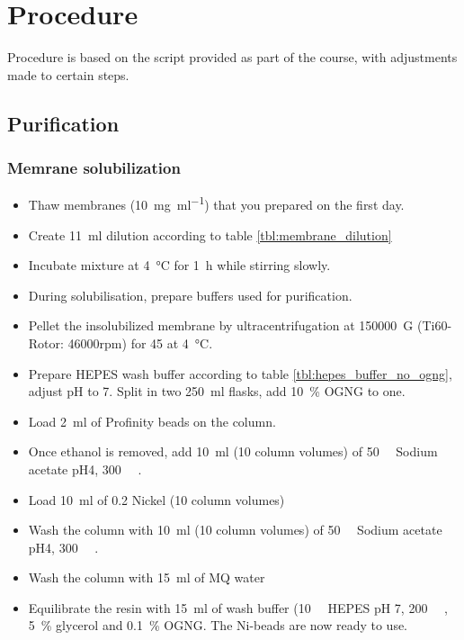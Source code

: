 \chapter{Procedure}

Procedure is based on the script provided as part of the course, with
adjustments made to certain steps.\cite{skript_ballmoos}

\section{Purification}

\subsection{Memrane solubilization}

\begin{itemize}
	\item Thaw membranes (\SI{10}{\mg\per\ml}) that you prepared on the
		first day.
	\item Create \SI{11}{\ml} dilution according to table
		\ref{tbl:membrane_dilution}
	\item Incubate mixture at \SI{4}{\celsius} for \SI{1}{\hour} while
		stirring slowly.
	\item During solubilisation, prepare buffers used for purification.
	\item Pellet the insolubilized membrane by ultracentrifugation at
		\SI{150000}{G} (Ti60-Rotor: 46000rpm) for \SI{45}{\min} at
		\SI{4}{\celsius}.
	\item Prepare HEPES wash buffer according to table
		\ref{tbl:hepes_buffer_no_ogng}, adjust pH to 7. Split in two
		\SI{250}{\ml} flasks, add \SI{10}{\percent} OGNG to one.
	\item Load \SI{2}{\ml} of Profinity beads on the column.
	\item Once ethanol is removed, add \SI{10}{\ml} (10 column volumes) of
		\SI{50}{\milli\Molar} Sodium acetate pH4,
		\SI{300}{\milli\Molar} .
	\item Load \SI{10}{\ml} of \SI{0.2}{\Molar} Nickel (10 column volumes) 
	\item Wash the column with \SI{10}{\ml} (10 column volumes) of
		\SI{50}{\milli\Molar} Sodium acetate pH4,
		\SI{300}{\milli\Molar} .
	\item Wash the column with \SI{15}{\ml} of MQ water
	\item Equilibrate the resin with \SI{15}{\ml} of wash buffer
		(\SI{10}{\milli\Molar} HEPES pH 7, \SI{200}{\milli\Molar}
		, \SI{5}{\percent} glycerol and \SI{0.1}{\percent}
		OGNG. The Ni-beads are now ready to use.
\end{itemize}

